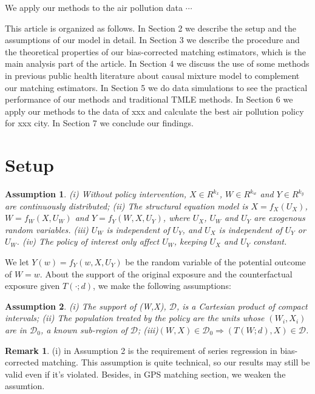 \documentclass{article}
\newtheorem{assumption}{Assumption}
\theoremstyle{definition}
\newtheorem{remark}{Remark}
\newtheorem{proof of proposition}{Proof of Proposition}
\begin{document}
We apply our methods to the air pollution data $\cdots$

This article is organized as follows. In Section 2 we describe the setup and the assumptions of our model in detail. In Section 3 we describe the procedure and the theoretical properties of our bias-corrected matching estimators, which is the main analysis part of the article. In Section 4 we discuss the use of some methods in previous public health literature about causal mixture model to complement our matching estimators. In Section 5 we do data simulations to see the practical performance of our methods and traditional TMLE methods. In Section 6 we apply our methods to the data of xxx and calculate the best air pollution policy for xxx city. In Section 7 we conclude our findings.
\section{Setup}
\begin{assumption}
(i) Without policy intervention, $X \in R^{k_x}$, $W \in R^{k_w}$ and $Y \in R^{k_y}$ are continuously distributed; (ii) The structural equation model is $X = f_X(U_X)$, $W = f_W(X, U_W)$ and $Y = f_Y (W, X, U_Y )$, where  $U_{X}$, $U_{W}$ and  $U_{Y}$  are exogenous random variables. (iii) $U_{W}$ is independent of $ U_{Y}$, and $U_{X}$ is independent of $ U_{Y}$ or $U_{W}$. (iv) The policy of interest only affect $U_{W}$, keeping $U_{X}$ and $ U_{Y}$ constant.
\end{assumption}
We let $Y(w)=f_Y(w,X,U_Y)$ be the random variable of the potential outcome of $W=w$. 
About the support of the original exposure and the counterfactual exposure given $T(\cdot;d)$, we make the following assumptions:

\begin{assumption}
(i) The support of (W,X), $\mathcal{D}$, is a Cartesian product of compact intervals; (ii) The population treated by the policy are the units whose $(W_i,X_i)$ are in $\mathcal{D}_0$, a known sub-region of $\mathcal{D}$; (iii)$(W,X) \in \mathcal{D}_0\Rightarrow (T(W;d),X)\in \mathcal{D}$.
\end{assumption}

\begin{remark} (i) in Assumption 2 is the requirement of series regression in bias-corrected matching. This assumption is quite technical, so our results may still be valid even if it's violated. Besides, in GPS matching section, we weaken the assumtion.
\end{remark}
\end{document}
